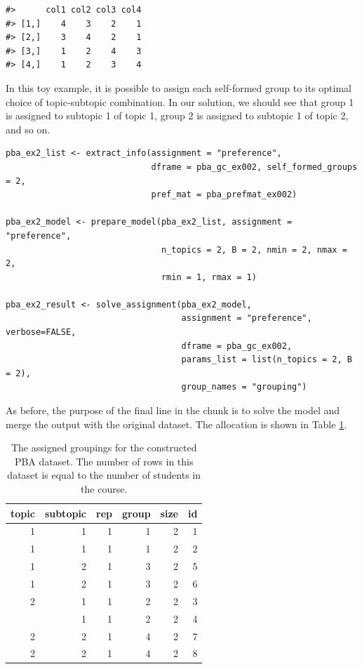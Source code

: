 \begin{verbatim}
#>      col1 col2 col3 col4
#> [1,]    4    3    2    1
#> [2,]    3    4    2    1
#> [3,]    1    2    4    3
#> [4,]    1    2    3    4
\end{verbatim}

In this toy example, it is possible to assign each self-formed group to its
optimal choice of topic-subtopic combination. In our solution, we should see
that group 1 is assigned to subtopic 1 of topic 1, group 2 is assigned to
subtopic 1 of topic 2, and so on.

\begin{verbatim}
pba_ex2_list <- extract_info(assignment = "preference", 
                             dframe = pba_gc_ex002, self_formed_groups = 2, 
                             pref_mat = pba_prefmat_ex002)

pba_ex2_model <- prepare_model(pba_ex2_list, assignment = "preference", 
                               n_topics = 2, B = 2, nmin = 2, nmax = 2, 
                               rmin = 1, rmax = 1)

pba_ex2_result <- solve_assignment(pba_ex2_model,   
                                   assignment = "preference", verbose=FALSE, 
                                   dframe = pba_gc_ex002,   
                                   params_list = list(n_topics = 2, B = 2),   
                                   group_names = "grouping")
\end{verbatim}

As before, the purpose of the final line in the chunk is to solve the model and merge the output with
the original dataset. The allocation is shown in Table \ref{tab:constructed-pba-2}.

\begin{table}[!h]
\centering
\caption{\label{tab:constructed-pba-2}The assigned groupings for the constructed PBA dataset. The number of rows in this dataset is equal to the number of students in the course.}
\centering
\begin{tabular}[t]{rrrrrr}
\toprule
topic & subtopic & rep & group & size & id\\
\midrule
1 & 1 & 1 & 1 & 2 & 1\\
1 & 1 & 1 & 1 & 2 & 2\\
1 & 2 & 1 & 3 & 2 & 5\\
1 & 2 & 1 & 3 & 2 & 6\\
2 & 1 & 1 & 2 & 2 & 3\\
\addlinespace
2 & 1 & 1 & 2 & 2 & 4\\
2 & 2 & 1 & 4 & 2 & 7\\
2 & 2 & 1 & 4 & 2 & 8\\
\bottomrule
\end{tabular}
\end{table}


